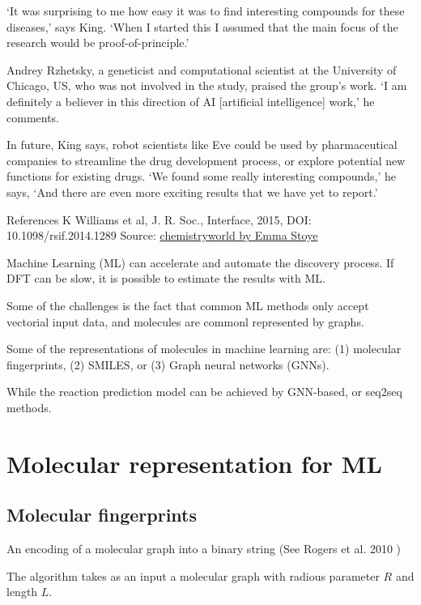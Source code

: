 \documentclass[b5paper]{report}
\begin{document}
\begin{mybox}
‘It was surprising to me how easy it was to find interesting compounds for
these diseases,’ says King. ‘When I started this I assumed that the main focus
of the research would be proof-of-principle.’

Andrey Rzhetsky, a geneticist and computational scientist at the University of
Chicago, US, who was not involved in the study, praised the group’s work. ‘I am
definitely a believer in this direction of AI [artificial intelligence] work,’
he comments.

In future, King says, robot scientists like Eve could be used by pharmaceutical
companies to streamline the drug development process, or explore potential new
functions for existing drugs. ‘We found some really interesting compounds,’ he
says, ‘And there are even more exciting results that we have yet to report.’

References
K Williams et al, J. R. Soc., Interface, 2015, DOI: 10.1098/rsif.2014.1289
Source:
\href{https://www.chemistryworld.com/news/robot-scientist-speeds-up-drug-discovery/8230.article}{chemistryworld
by Emma Stoye}
\end{mybox}

Machine Learning (ML) can accelerate and automate the discovery process. If DFT can
be slow, it is possible to estimate the results with ML.

Some of the challenges is the fact that common ML methods only accept vectorial
input data, and molecules are commonl represented by graphs.

Some of the representations of molecules in machine learning are: (1) molecular
fingerprints, (2) SMILES, or (3) Graph neural networks (GNNs).

While the reaction prediction model can be achieved by GNN-based, or seq2seq
methods.

\section{Molecular representation for ML}

\subsection{Molecular fingerprints}

An encoding of a molecular graph into a binary string (See Rogers et al. 2010
\cite{rogers2010extended})

The algorithm takes as an input a molecular graph with radious parameter $R$
and length $L$.
\end{document}
